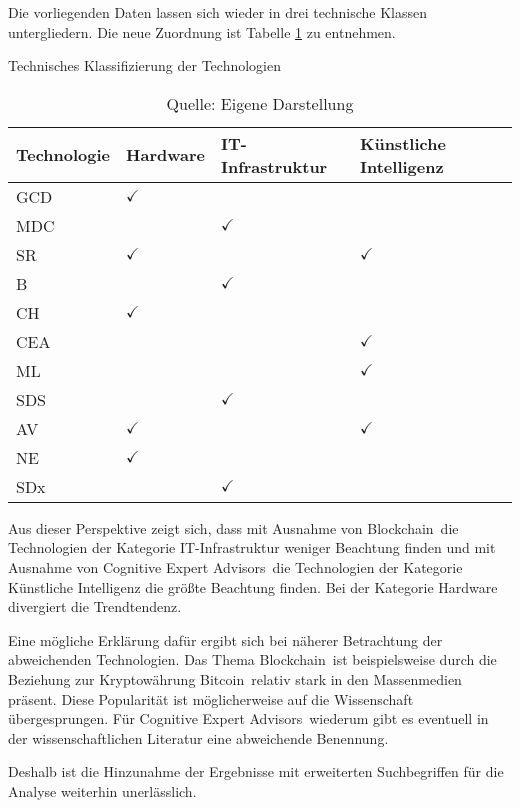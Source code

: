 Die vorliegenden Daten lassen sich wieder in drei technische Klassen untergliedern. Die neue Zuordnung ist Tabelle \ref{tab:class_tech_new} zu entnehmen.

\begin{table}
	\caption{Technisches Klassifizierung der Technologien}
	\selectfont
	\centering
	\label{tab:class_tech_new}
	\begin{tabularx}{\linewidth}{X|p{2cm}XX}
		Technologie & Hardware & IT-Infrastruktur & Künstliche Intelligenz \\
		\hline
		\acs{GCD} & $\checkmark$ & & \\
		\hline
		\acs{MDC} & & $\checkmark$ & \\
		\hline
		\acs{SR} & $\checkmark$ & & $\checkmark$ \\
		\hline
		\acs{B} & & $\checkmark$ & \\
		\hline
		\acs{CH} & $\checkmark$ & & \\
		\hline
		\acs{CEA} & & & $\checkmark$ \\
		\hline
		\acs{ML} & & & $\checkmark$ \\
		\hline
		\acs{SDS} & & $\checkmark$ & \\
		\hline
		\acs{AV} & $\checkmark$ & & $\checkmark$ \\
		\hline
		\acs{NE} & $\checkmark$ & & \\
		\hline
		\acs{SDx} & & $\checkmark$ & \\
		\hline
	\end{tabularx}
	\caption*{Quelle: Eigene Darstellung}
\end{table}

Aus dieser Perspektive zeigt sich, dass mit Ausnahme von \glqq Blockchain\grqq~die Technologien der Kategorie IT-Infrastruktur weniger Beachtung finden und mit Ausnahme von \glqq Cognitive Expert Advisors\grqq~die Technologien der Kategorie Künstliche Intelligenz die größte Beachtung finden. Bei der Kategorie Hardware divergiert die Trendtendenz.

Eine mögliche Erklärung dafür ergibt sich bei näherer Betrachtung der abweichenden Technologien. Das Thema \glqq Blockchain\grqq~ist beispielsweise durch die Beziehung zur Kryptowährung \glqq Bitcoin\grqq~relativ stark in den Massenmedien präsent. Diese Popularität ist möglicherweise auf die Wissenschaft übergesprungen. Für \glqq Cognitive Expert Advisors\grqq~wiederum gibt es eventuell in der wissenschaftlichen Literatur eine abweichende Benennung.

Deshalb ist die Hinzunahme der Ergebnisse mit erweiterten Suchbegriffen für die Analyse weiterhin unerlässlich.

